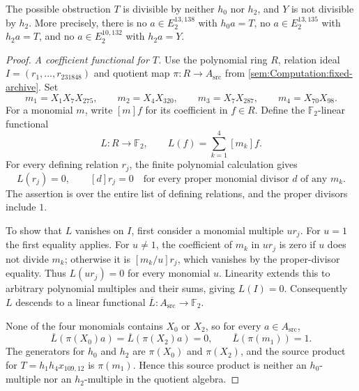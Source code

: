 \begin{theorem}
\label{sem:Computation:nondivisibility}
The possible obstruction $T$ is divisible by neither $h_0$ nor $h_2$,
and $Y$ is not divisible by $h_2$. More precisely, there is no
$a\in E_2^{13,138}$ with $h_0a=T$, no $a\in E_2^{13,135}$ with
$h_2a=T$, and no $a\in E_2^{10,132}$ with $h_2a=Y$.
\end{theorem}
\begin{proof}
\textit{A coefficient functional for $T$.}
Use the polynomial ring $R$, relation ideal $I=(r_1,\ldots,r_{231848})$
and quotient map $\pi:R\to A_{\mathrm{src}}$ from
\ref{sem:Computation:fixed-archive}. Set
\[
m_1=X_1X_7X_{275},\qquad m_2=X_4X_{320},\qquad
m_3=X_7X_{287},\qquad m_4=X_{70}X_{98}.
\]
For a monomial $m$, write $[m]f$ for its coefficient in $f\in R$.
Define the $\mathbb F_2$-linear functional
\[
L:R\longrightarrow\mathbb F_2,\qquad L(f)=\sum_{k=1}^{4}[m_k]f.
\]
For every defining relation $r_j$, the finite polynomial calculation gives
\[
L(r_j)=0,\qquad [d]r_j=0
\quad\text{for every proper monomial divisor $d$ of any $m_k$.}
\]
The assertion is over the entire list of defining relations, and the
proper divisors include $1$.

To show that $L$ vanishes on $I$, first consider a monomial multiple
$u r_j$. For $u=1$ the first equality applies. For $u\ne1$, the
coefficient of $m_k$ in $u r_j$ is zero if $u$ does not divide $m_k$;
otherwise it is $[m_k/u]r_j$, which vanishes by the proper-divisor
equality. Thus $L(u r_j)=0$ for every monomial $u$. Linearity extends
this to arbitrary polynomial multiples and their sums, giving $L(I)=0$.
Consequently $L$ descends to a linear functional
$\overline L:A_{\mathrm{src}}\to\mathbb F_2$.

None of the four monomials contains $X_0$ or $X_2$, so for every
$a\in A_{\mathrm{src}}$,
\[
\overline L(\pi(X_0)a)=\overline L(\pi(X_2)a)=0,
\qquad \overline L(\pi(m_1))=1.
\]
The generators for $h_0$ and $h_2$ are $\pi(X_0)$ and $\pi(X_2)$,
and the source product for $T=h_1h_4x_{109,12}$ is $\pi(m_1)$.
Hence this source product is neither an $h_0$-multiple nor an
$h_2$-multiple in the quotient algebra.


\end{proof}
